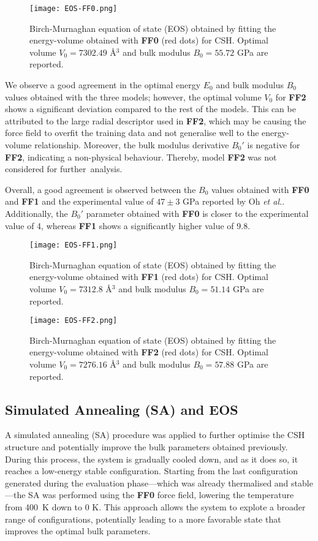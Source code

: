 \begin{figure}[h!]
    \centering
    \texttt{[image: EOS-FF0.png]}
    \caption{Birch-Murnaghan equation of state (EOS) obtained by fitting the energy-volume obtained with \textbf{FF0} (red dots) for CSH. Optimal volume $V_0=7302.49$ \AA$^3$ and bulk modulus $B_0=55.72$ GPa are reported.
    }
    \label{fig:eos-ff0}
\end{figure}

We observe a good agreement in the optimal energy $E_0$ and bulk modulus $B_0$ values obtained with the three models; however, the optimal volume $V_0$ for \textbf{FF2} shows a significant deviation compared to the rest of the models. This can be attributed to the large radial descriptor used in \textbf{FF2}, which may be causing the force field to overfit the training data and not generalise well to the energy-volume relationship. Moreover, the bulk modulus derivative $B_0'$ is negative for \textbf{FF2}, indicating a non-physical behaviour. Thereby, model \textbf{FF2} was not considered for further~analysis. 

Overall, a good agreement is observed between the $B_0$ values obtained with \textbf{FF0} and \textbf{FF1} and the experimental value of $47\pm 3$ GPa reported by Oh \emph{et al.}\supercite{Oh2012}. Additionally, the $B_0'$ parameter obtained with \textbf{FF0} is closer to the experimental value of 4\supercite{Oh2012}, whereas \textbf{FF1} shows a significantly higher value of 9.8. 
\begin{figure}[h!]
    \centering
    \texttt{[image: EOS-FF1.png]}
    \caption{
    Birch-Murnaghan equation of state (EOS) obtained by fitting the energy-volume obtained with \textbf{FF1} (red dots) for CSH. Optimal volume $V_0=7312.8$ \AA$^3$ and bulk modulus $B_0=51.14$ GPa are reported.
    }
    \label{fig:eos-ff1}
\end{figure}
\begin{figure}[H]
    \centering
    \texttt{[image: EOS-FF2.png]}
    \caption{
    Birch-Murnaghan equation of state (EOS) obtained by fitting the energy-volume obtained with \textbf{FF2} (red dots) for CSH. Optimal volume $V_0=7276.16$ \AA$^3$ and bulk modulus $B_0=57.88$ GPa are reported.}
    \label{fig:eos-ff2}
\end{figure}

\subsection{Simulated Annealing (SA) and EOS}
A simulated annealing (SA) procedure was applied to further optimise the CSH structure and potentially improve the bulk parameters obtained previously. During this process, the system is gradually cooled down, and as it does so, it reaches a low-energy stable configuration. Starting from the last configuration generated during the evaluation phase---which was already thermalised and stable---the SA was performed using the \textbf{FF0} force field, lowering the temperature from 400~K down to 0 K. This approach allows the system to explote a broader range of configurations, potentially leading to a more favorable state that improves the optimal bulk parameters.

